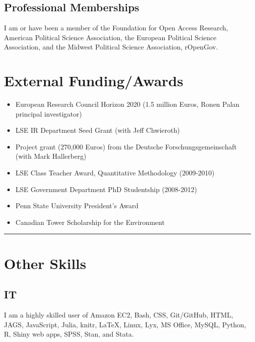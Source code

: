 \documentclass[a4paper]{article}
\begin{document}
\subsection*{Professional Memberships}

I am or have been a member of the Foundation for Open Access Research, American Political Science Association, the European Political Science Association, and the Midwest Political Science Association, rOpenGov.

\section*{External Funding/Awards}

\begin{itemize}

    \item European Research Council Horizon 2020 (1.5 million Euros, Ronen Palan principal investigator)
    \item LSE IR Department Seed Grant (with Jeff Chwieroth)
    \item Project grant (270,000 Euros) from the Deutsche Forschungsgemeinschaft (with Mark Hallerberg)
    \item LSE Class Teacher Award, Quantitative Methodology (2009-2010)
    \item LSE Government Department PhD Studentship (2008-2012)
    \item Penn State University President's Award
    \item Canadian Tower Scholarship for the Environment

\end{itemize}

\vspace{0.5cm}
\medskip\hrule height 1pt
\vspace{0.5cm}

\section*{Other Skills}

\subsection*{IT}

I am a highly skilled user of Amazon EC2, Bash, CSS, Git/GitHub, HTML, JAGS, JavaScript, Julia, knitr, LaTeX, Linux, Lyx, MS Office, MySQL, Python, R, Shiny web apps, SPSS, Stan, and Stata.
\end{document}
